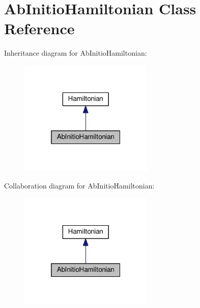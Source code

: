 \hypertarget{classAbInitioHamiltonian}{}\section{Ab\+Initio\+Hamiltonian Class Reference}
\label{classAbInitioHamiltonian}


Inheritance diagram for Ab\+Initio\+Hamiltonian\+:
\nopagebreak
\begin{figure}[H]
\begin{center}
\leavevmode
\includegraphics[width=181pt]{classAbInitioHamiltonian__inherit__graph}
\end{center}
\end{figure}


Collaboration diagram for Ab\+Initio\+Hamiltonian\+:
\nopagebreak
\begin{figure}[H]
\begin{center}
\leavevmode
\includegraphics[width=181pt]{classAbInitioHamiltonian__coll__graph}
\end{center}
\end{figure}

